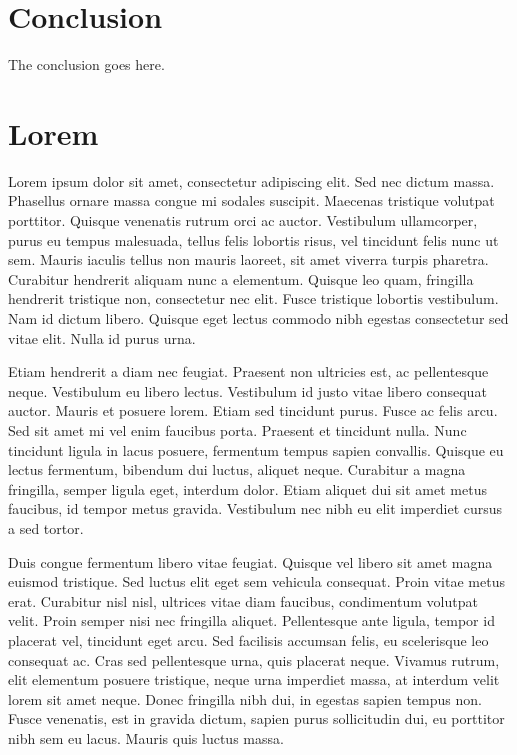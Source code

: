 \documentclass[journal]{IEEEtran}
\begin{document}
\section{Conclusion}
The conclusion goes here.



\section{Lorem}
Lorem ipsum dolor sit amet, consectetur adipiscing elit. Sed nec dictum massa. Phasellus ornare massa congue mi sodales suscipit. Maecenas tristique volutpat porttitor. Quisque venenatis rutrum orci ac auctor. Vestibulum ullamcorper, purus eu tempus malesuada, tellus felis lobortis risus, vel tincidunt felis nunc ut sem. Mauris iaculis tellus non mauris laoreet, sit amet viverra turpis pharetra. Curabitur hendrerit aliquam nunc a elementum. Quisque leo quam, fringilla hendrerit tristique non, consectetur nec elit. Fusce tristique lobortis vestibulum. Nam id dictum libero. Quisque eget lectus commodo nibh egestas consectetur sed vitae elit. Nulla id purus urna.

Etiam hendrerit a diam nec feugiat. Praesent non ultricies est, ac pellentesque neque. Vestibulum eu libero lectus. Vestibulum id justo vitae libero consequat auctor. Mauris et posuere lorem. Etiam sed tincidunt purus. Fusce ac felis arcu. Sed sit amet mi vel enim faucibus porta. Praesent et tincidunt nulla. Nunc tincidunt ligula in lacus posuere, fermentum tempus sapien convallis. Quisque eu lectus fermentum, bibendum dui luctus, aliquet neque. Curabitur a magna fringilla, semper ligula eget, interdum dolor. Etiam aliquet dui sit amet metus faucibus, id tempor metus gravida. Vestibulum nec nibh eu elit imperdiet cursus a sed tortor.

Duis congue fermentum libero vitae feugiat. Quisque vel libero sit amet magna euismod tristique. Sed luctus elit eget sem vehicula consequat. Proin vitae metus erat. Curabitur nisl nisl, ultrices vitae diam faucibus, condimentum volutpat velit. Proin semper nisi nec fringilla aliquet. Pellentesque ante ligula, tempor id placerat vel, tincidunt eget arcu. Sed facilisis accumsan felis, eu scelerisque leo consequat ac. Cras sed pellentesque urna, quis placerat neque. Vivamus rutrum, elit elementum posuere tristique, neque urna imperdiet massa, at interdum velit lorem sit amet neque. Donec fringilla nibh dui, in egestas sapien tempus non. Fusce venenatis, est in gravida dictum, sapien purus sollicitudin dui, eu porttitor nibh sem eu lacus. Mauris quis luctus massa.
\end{document}
